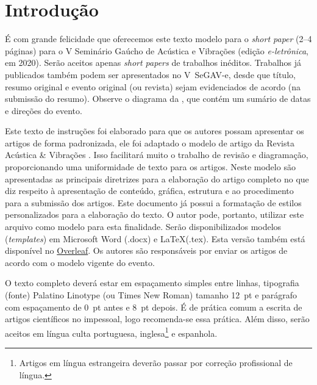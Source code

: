 \documentclass[12pt, a4paper, twoside, twocolumn]{article}
\begin{document}
 \setcounter{page}{1}

\section{Introdução}

É com grande felicidade que oferecemos este texto modelo para o \textit{short paper} (2--4 páginas) para o V Seminário Gaúcho de Acústica e Vibrações (edição \textit{e-letrônica}, em 2020). Serão aceitos apenas \textit{short papers} de trabalhos inéditos. Trabalhos já publicados também podem ser apresentados no V~SeGAV-e, desde que título, resumo original e evento original (ou revista) sejam evidenciados de acordo (na submissão do resumo).
%
Observe o diagrama da , que contém um sumário de datas e direções do evento.

Este texto de instruções foi elaborado para que os autores possam apresentar os artigos de forma padronizada, ele foi adaptado o modelo de artigo da Revista Acústica \& Vibrações \cite{modelo}. Isso facilitará muito o trabalho de revisão e diagramação, proporcionando uma uniformidade de texto para os artigos. Neste modelo são apresentadas as principais diretrizes para a elaboração do artigo completo no que diz respeito à apresentação de conteúdo, gráfica, estrutura e ao procedimento para a submissão dos artigos.
% 
Este documento já possui a formatação de estilos personalizados para a elaboração do texto. O autor pode, portanto, utilizar este arquivo como modelo para esta finalidade. Serão disponibilizados modelos (\textit{templates}) em Microsoft Word (.docx) e \LaTeX\xspace (.tex). Esta versão também está disponível no \href{https://pt.overleaf.com/read/vqrvdftgcfkg}{Overleaf}. Os autores são responsáveis por enviar os artigos de acordo com o modelo vigente do evento.

O texto completo deverá estar em espaçamento simples entre linhas, tipografia (fonte) Palatino Linotype (ou Times New Roman) tamanho 12~pt e parágrafo com espaçamento de 0~pt antes e 8~pt depois. É de prática comum a escrita de artigos científicos no impessoal, logo recomenda-se essa prática. Além disso, serão aceitos em língua culta portuguesa, inglesa\footnote{Artigos em língua estrangeira deverão passar por correção profissional de língua.} e espanhola. 
\end{document}
